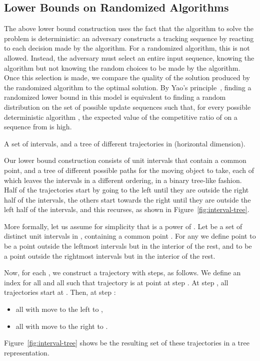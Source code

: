 \documentclass[runningheads]{llncs}
\begin{document}
\subsection{Lower Bounds on Randomized Algorithms} \label {sec:lowerbounds_random}
The above lower bound construction uses the fact that the algorithm to solve the problem is deterministic: an adversary constructs a tracking sequence by reacting to each decision made by the algorithm. For a randomized algorithm, this is not allowed. Instead, the adversary must
select an entire input sequence, knowing the algorithm but not knowing the random choices to be made by the algorithm. Once this selection is made, we compare the quality of the solution produced by the randomized algorithm to the optimal solution.
By Yao's principle~\cite{cllr-bbcr-97,Yao-FOCS-77}, 
finding a randomized lower bound in this model is equivalent to finding a random distribution  on the set of possible update sequences such that, for every possible deterministic algorithm , the expected value of the competitive ratio of  on a sequence from  is high.

 {A set of  intervals, and a tree of  different trajectories in  (horizontal dimension).}

Our lower bound construction consists of  unit intervals that contain a common point, and a tree of  different possible paths for the moving object to take, each of which leaves the intervals in a different ordering, in a binary tree-like fashion. Half of the trajectories start by going to the left until they are outside the right half of the intervals, the others start towards the right until they are outside the left half of the intervals, and this recurses, as shown in Figure~\ref {fig:interval-tree}.

More formally, let us assume for simplicity that  is a power of .
Let  be a set of  distinct unit intervals in , containing a common point .
For any  we define point  to be a point outside the leftmost  intervals but in the interior of the rest, and  to be a point outside the rightmost  intervals but in the interior of the rest.

Now, for each , we construct a trajectory  with  steps, as follows. We define an index  for all  and all  such that trajectory  is at point  at step . At step , all trajectories start at .  Then, at step :
      \begin {itemize}
        \item all  with  move to the left to ,
        \item all  with  move to the right to .
      \end {itemize}
Figure~\ref {fig:interval-tree} shows  be the resulting set of these  trajectories in a tree representation.
\end{document}
